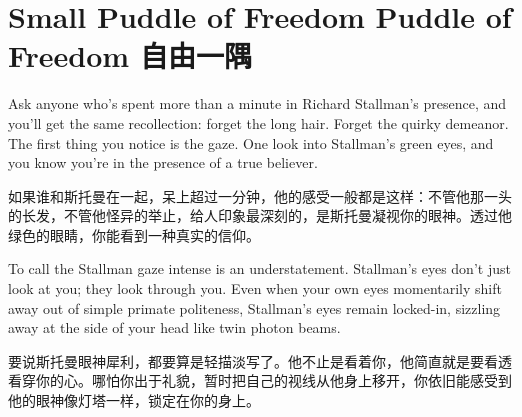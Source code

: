 \chapter{\ifdefined\eng
\ifdefined\vone 
Small Puddle of Freedom
\fi
\ifdefined\vtwo
Puddle of Freedom
\fi
\fi
\ifdefined\chs
自由一隅
\fi}
\thispagestyle{empty}
\ifdefined\eng
\ifdefined{}
\fi
\fi

\ifdefined\chs
\ifdefined{}
\fi
\fi

\ifdefined\eng
Ask anyone who's spent more than a minute in Richard Stallman's presence, and you'll get the same recollection: forget the long hair. Forget the quirky demeanor. The first thing you notice is the gaze. One look into Stallman's green eyes, and you know you're in the presence of a true believer.
\fi

\ifdefined\chs
如果谁和斯托曼在一起，呆上超过一分钟，他的感受一般都是这样：不管他那一头的长发，不管他怪异的举止，给人印象最深刻的，是斯托曼凝视你的眼神。透过他绿色的眼睛，你能看到一种真实的信仰。
\fi

\ifdefined\eng
To call the Stallman gaze intense is an understatement. Stallman's eyes don't just look at you; they look through you. Even when your own eyes momentarily shift away out of simple primate politeness, Stallman's eyes remain locked-in, sizzling away at the side of your head like twin photon beams.
\fi

\ifdefined\chs
要说斯托曼眼神犀利，都要算是轻描淡写了。他不止是看着你，他简直就是要看透看穿你的心。哪怕你出于礼貌，暂时把自己的视线从他身上移开，你依旧能感受到他的眼神像灯塔一样，锁定在你的身上。
\fi

